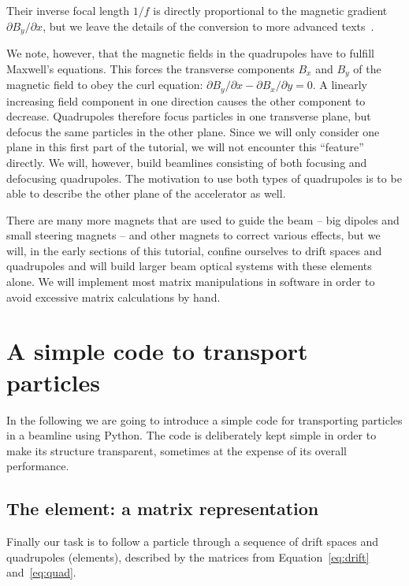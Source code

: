 \documentclass{article}
\newcommand\pt{\partial}
\begin{document}
Their inverse focal length $1/f$ is directly proportional to the magnetic gradient 
$\pt B_y/\pt x$, but we leave the details of the conversion to more advanced 
texts~\cite{VZAPB,WOLSKI,WIEDEMANN,SYLEE}.
\par
We note, however, that the magnetic fields in the quadrupoles have to fulfill
Maxwell's equations. This forces the transverse components $B_x$ and $B_y$ of 
the magnetic field to obey the curl equation: $\pt B_y/\pt x - \pt B_x/\pt y =0.$ 
A linearly increasing field component in one direction causes the other component 
to decrease. Quadrupoles therefore focus particles in one transverse plane, but 
defocus the same particles in the other plane. Since we will only consider one 
plane in this first part of the tutorial, we will not encounter this ``feature'' directly. We will, 
however, build beamlines consisting of both focusing and defocusing quadrupoles. 
The motivation to use both types of quadrupoles is to be able to describe the other
plane of the accelerator as well.
\par
There are many more magnets that are used to guide the beam -- big dipoles and small
steering magnets -- and other magnets to correct various effects, but we will, in
the early sections of this tutorial, confine ourselves to drift spaces and quadrupoles 
and will build larger beam optical systems with these elements alone. We will 
implement most matrix manipulations in software in order to avoid excessive matrix 
calculations by hand.
%
\section{A simple code to transport particles}

In the following we are going to introduce a simple code for transporting particles in a beamline using Python. The code is deliberately kept simple in order to make its
structure transparent, sometimes at the expense of its overall
performance.

\subsection{The element: a matrix representation}

Finally our task is to follow a particle through a sequence of drift spaces and quadrupoles (elements),
described by the matrices from Equation~\ref{eq:drift} and~\ref{eq:quad}.
\end{document}
